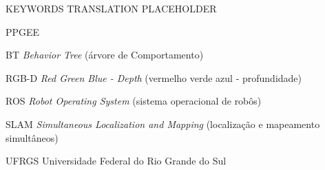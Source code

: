 \documentclass[repeatfields,xlists,xpacks,oneside,yearsonly]{ufrgscca}
\begin{document}
\maketitle




\begin{abstract}

\end{abstract}

\begin{otherabstract}{KEYWORDS TRANSLATION PLACEHOLDER}

\end{otherabstract}

\setcounter{tocdepth}{3}

\listoffigures

\listoftables

\begin{listofabbrv}{PPGEE}
    \item[BT] \textit{Behavior Tree} (árvore de Comportamento)
    \item[RGB-D] \textit{Red Green Blue - Depth} (vermelho verde azul -
    profundidade)
    \item[ROS] \textit{Robot Operating System} (sistema operacional de robôs)
    \item[SLAM] \textit{Simultaneous Localization and Mapping} (localização e
    mapeamento simultâneos)
    \item[UFRGS] Universidade Federal do Rio Grande do Sul
\end{listofabbrv}

\end{document}
